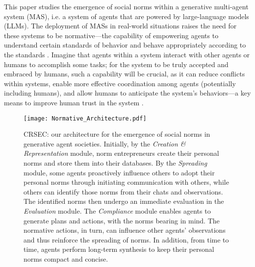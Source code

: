\documentclass{article}
\begin{document}
This paper studies the emergence of social norms within a generative multi-agent system (MAS), i.e. a system of agents that are powered by large-language models (LLMs). 
The deployment of MASs in real-world situations raises the need for these systems to be normative---the capability of empowering agents to understand certain standards of behavior and behave appropriately according to the standards \cite{boella2008introduction,criado2011open,oldenburg2024learning}. 
Imagine that agents within a system interact with other agents or humans to accomplish some tasks; for the system to be truly accepted and embraced by humans, such a capability will be crucial, as it can reduce conflicts within systems, enable more effective coordination among agents (potentially including humans), and allow humans to anticipate the system's behaviors---a key means to improve human trust in the system \cite{awad2018moral,ajmeri2020elessar,chugunova2022we,liullm}.

\begin{figure*}[htbp]
    \centering
\texttt{[image: Normative\_Architecture.pdf]}
    \vspace{-0.2cm}
    \caption{CRSEC: our architecture for the emergence of social norms in generative agent societies. Initially, by the \textit{Creation \& Representation} module, norm entrepreneurs create their personal norms and store them into their databases. By the \textit{Spreading} module, some agents proactively influence others to adopt their personal norms through initiating communication with others, while others can identify those norms from their chats and observations. The identified norms then undergo an immediate evaluation in the \textit{Evaluation} module.
The \textit{Compliance} module enables agents to generate plans and actions, with the norms bearing in mind.
The normative actions, in turn, can influence other agents' observations and thus reinforce the spreading of norms. In addition, from time to time, agents perform long-term synthesis to keep their personal norms compact and concise. }
    \vspace{-0.3cm}
    \label{fig 1: Normative architecture}
\end{figure*}
\end{document}
